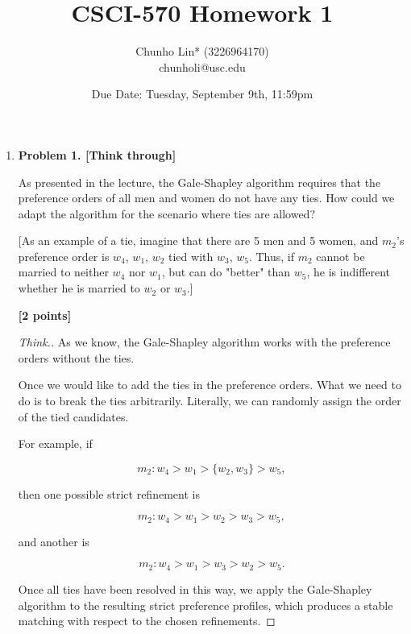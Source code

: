 \documentclass[11pt]{article}
\begin{document}
\author{Chunho Lin* (3226964170)\\chunholi@usc.edu}
\title{CSCI-570 Homework 1}
\date{Due Date: Tuesday, September 9th, 11:59pm}
\maketitle

\medskip

\begin{enumerate}

\item \textbf{Problem 1. [Think through]}

As presented in the lecture, the Gale-Shapley algorithm requires that the preference orders of all men and women do not have any ties. How could we adapt the algorithm for the scenario where ties are allowed?

[As an example of a tie, imagine that there are 5 men and 5 women, and $m_2$'s preference order is $w_4$, $w_1$, $w_2$ tied with $w_3$, $w_5$. Thus, if $m_2$ cannot be married to neither $w_4$ nor $w_1$, but can do "better" than $w_5$, he is indifferent whether he is married to $w_2$ or $w_3$.]

\begin{flushright}
\textbf{[2 points]}
\end{flushright}

\begin{proof}[Think.]

As we know, the Gale-Shapley algorithm works with the preference orders without the ties.

Once we would like to add the ties in the preference orders. What we need to do is to break the ties arbitrarily. Literally, we can randomly assign the order of the tied candidates.

For example, if

$$
{m_2} : w_4 > w_1 > \{w_2, w_3\} > w_5,
$$

then one possible strict refinement is

$$
{m_2} : w_4 > w_1 > w_2 > w_3 > w_5,
$$

and another is

$$
{m_2} : w_4 > w_1 > w_3 > w_2 > w_5.
$$

Once all ties have been resolved in this way, we apply the Gale-Shapley algorithm to the resulting strict preference profiles, which produces a stable matching with respect to the chosen refinements.

\end{proof}


\end{enumerate}
\end{document}
